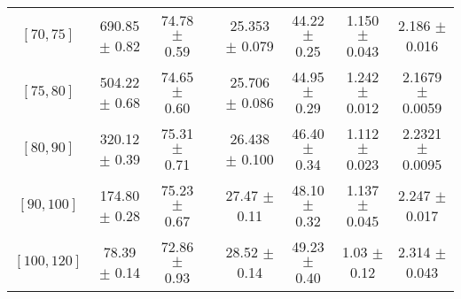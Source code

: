 \begin{tabular}{c||c|c|c|c|c|c|c}
$[70, 75]$ & 690.85 $\pm$ 0.82 & 74.78 $\pm$ 0.59 &  & 25.353 $\pm$ 0.079 & 44.22 $\pm$ 0.25 & 1.150 $\pm$ 0.043 & 2.186 $\pm$ 0.016\\
$[75, 80]$ & 504.22 $\pm$ 0.68 & 74.65 $\pm$ 0.60 &  & 25.706 $\pm$ 0.086 & 44.95 $\pm$ 0.29 & 1.242 $\pm$ 0.012 & 2.1679 $\pm$ 0.0059\\
$[80, 90]$ & 320.12 $\pm$ 0.39 & 75.31 $\pm$ 0.71 &  & 26.438 $\pm$ 0.100 & 46.40 $\pm$ 0.34 & 1.112 $\pm$ 0.023 & 2.2321 $\pm$ 0.0095\\
$[90, 100]$ & 174.80 $\pm$ 0.28 & 75.23 $\pm$ 0.67 &  & 27.47 $\pm$ 0.11 & 48.10 $\pm$ 0.32 & 1.137 $\pm$ 0.045 & 2.247 $\pm$ 0.017\\
$[100, 120]$ & 78.39 $\pm$ 0.14 & 72.86 $\pm$ 0.93 &  & 28.52 $\pm$ 0.14 & 49.23 $\pm$ 0.40 & 1.03 $\pm$ 0.12 & 2.314 $\pm$ 0.043\\
\end{tabular}
